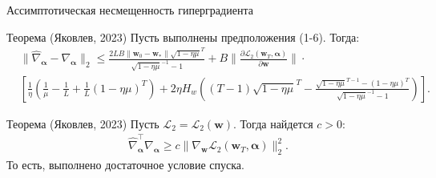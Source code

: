 \documentclass[aspectratio=169]{beamer}
\def\bw{\mathbf{w}}
\begin{document}
\begin{frame}{Ассимптотическая несмещенность гиперградиента}

  \begin{block}{Теорема (Яковлев, 2023)}
    Пусть выполнены предположения (1-6). Тогда:
    \begin{align*}
     &\|\hat{\nabla}_{\boldsymbol{\alpha}} - \nabla_{\boldsymbol{\alpha}}\|_2 \leq \frac{2LB\|\mathbf{w}_0 - \mathbf{w}_*\|\sqrt{1 - \eta\mu}^T}{\sqrt{1 - \eta\mu}^{-1} - 1} +
     B\|\frac{\partial\mathcal{L}_2(\mathbf{w}_T, \boldsymbol{\alpha})}{\partial\mathbf{w}}\| \cdot \\
     &\left[
      \frac{1}{\eta}(\frac{1}{\mu} - \frac{1}{L} + \frac{1}{L}(1 - \eta\mu)^T) + 2\eta H_w((T - 1)\sqrt{1 - \eta\mu}^T- 
      \frac{\sqrt{1 - \eta\mu}^{T-1} - (1 - \eta\mu)^T}{\sqrt{1 - \eta\mu}^{-1} - 1})
     \right].
    \end{align*}
  \end{block}

  \begin{block}{Теорема (Яковлев, 2023)}
    Пусть $\mathcal{L}_2 = \mathcal{L}_2(\bw)$. Тогда найдется $c > 0$:
    \begin{align*}
      \hat{\nabla}_{\boldsymbol{\alpha}}^\top\nabla_{\boldsymbol{\alpha}} \geq c\|\nabla_{\bw}\mathcal{L}_2(\bw_T, \boldsymbol{\alpha})\|_2^2.
    \end{align*}
    То есть, выполнено достаточное условие спуска.
  \end{block}
  
\end{frame}
\end{document}
